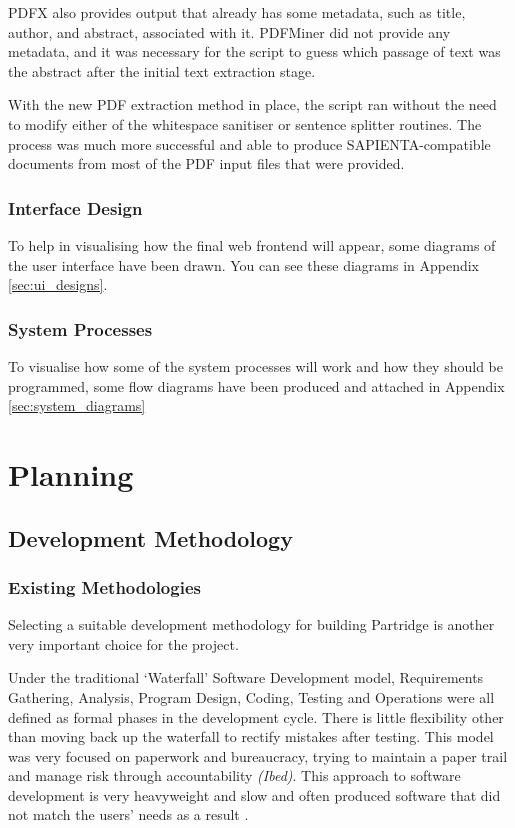 \documentclass[12pt,a4paper]{article}
\begin{document}
PDFX also provides output that already has some metadata, such as title,
author, and abstract, associated with it. PDFMiner did not provide any
metadata, and it was necessary for the script to guess which passage of text
was the abstract after the initial text extraction stage.

With the new PDF extraction method in place, the script ran without the need
to modify either of the whitespace sanitiser or sentence splitter routines. The
process was much more successful and able to produce SAPIENTA-compatible
documents from most of the PDF input files that were provided.


\subsubsection{Interface Design}

To help in visualising how the final web frontend will appear, some diagrams of
the user interface have been drawn. You can see these diagrams in Appendix
\ref{sec:ui_designs}. 

\subsubsection{System Processes}

To visualise how some of the system processes will work and how they should be
programmed, some flow diagrams have been produced and attached in Appendix
\ref{sec:system_diagrams}

\section{Planning}

\subsection{Development Methodology}

\subsubsection{Existing Methodologies}
Selecting a suitable development methodology for building Partridge is another
very important choice for the project.

Under the traditional `Waterfall' Software Development model, Requirements
Gathering, Analysis, Program Design, Coding, Testing and Operations were all
defined as formal phases in the development cycle. There is little flexibility
other than moving back up the waterfall to rectify mistakes after
testing\cite{Royce:1987:MDL:41765.41801}. This model was very focused on
paperwork and bureaucracy, trying to maintain a paper trail and manage risk
through accountability \emph{(Ibed)}. This approach to software development is
very heavyweight and slow and often produced software that did not match the
users' needs as a result \cite{Boehm1988}.
\end{document}
